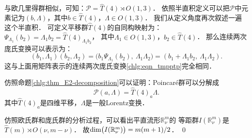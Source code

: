 与欧几里得群相似，可知：$\mathcal{P}= \hat{T}(4) \rtimes O(1,3)$．
依照半直积定义可以把$\mathcal{P}$中元素记为$(b,\Lambda)$，其中$b\in \hat{T}(4)$，$\Lambda\in O(1,3)$．
我们从定义角度再次叙述一遍这个半直积．
可定义平移群$\hat{T}(4)$的自同构映射为：
$\Psi_{\Lambda_1}( b_2)=\Lambda_1 b_2 = \hat{T}(4)_{\Lambda_1 b_2}$，
其中$\Lambda_1 \in O(1,3)$，$b_2\in \hat{T}(4)$．
那么连续两次庞氏变换可以表示为：
\begin{equation}\label{chlg:eqn_ptp}
    (b_1, \Lambda_1)(b_2, \Lambda_2)
    =\bigl(b_1 \Psi_{\Lambda_1}( b_2),\ \Lambda_1 \Lambda_2 \bigr)
    =(b_1 + \Lambda_1 b_2 ,\ \Lambda_1 \Lambda_2) .
\end{equation}
这与上面用矩阵表示的连续两次庞氏变换\eqref{chlg:eqn_tmpptp}完全相同．

仿照命题\ref{chlg:thm_E2-decomposition}可以证明：Poincar\'{e}群可以分解成
\begin{equation}\label{chlg:eqn_PL-decomposition}
    \mathcal{P}(a,\Lambda)= \hat{T}(4)_{a} \Lambda .
\end{equation}
其中$\hat{T}(4)_{a}$是四维平移，$\Lambda$是一般Lorentz变换．



\begin{example}\label{chlg:exm_Rmnu}
    仿照欧氏群和庞氏群的分析过程，可以看出平直流形$\mathbb{R}^m_\nu$的
    等距群$I(\mathbb{R}^m_\nu)$是$\hat{T}(m)\rtimes O(\nu,m-\nu)$．
    故${\rm dim}\bigl(I(\mathbb{R}^m_\nu)\bigr)= m(m+1)/2 $．    \qed
\end{example}


